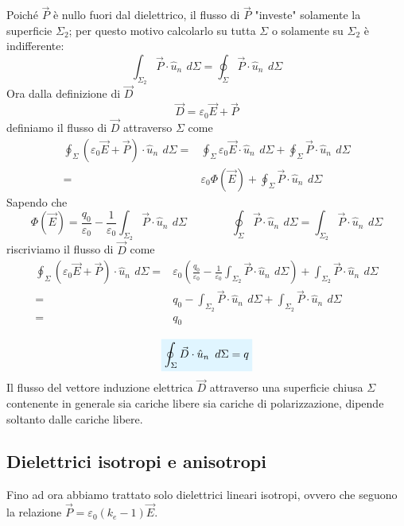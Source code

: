 \documentclass[x11names]{report}
\begin{document}
Poiché \(\vec{P}\) è nullo fuori dal dielettrico, il flusso di \(\vec{P}\) "investe" solamente la superficie \(\Sigma_2\); per questo motivo calcolarlo su tutta \(\Sigma\) o solamente su \(\Sigma_2\) è indifferente:
\[
\int_{\Sigma_2}\vec{P}\cdot\hat{u}_n \,\ d\Sigma = \oint_{\Sigma}\vec{P}\cdot\hat{u}_n \,\ d\Sigma
\]
Ora dalla definizione di \(\vec{D}\)
\[
\vec{D} = \varepsilon_0 \vec{E} + \vec{P}
\]
definiamo il flusso di \(\vec{D}\) attraverso \(\Sigma\) come
\begin{align*}
	\oint_\Sigma \left(\varepsilon_0 \vec{E} + \vec{P}\right)\cdot\hat{u}_n \,\ d\Sigma =& \oint_\Sigma \varepsilon_0 \vec{E}\cdot\hat{u}_n \,\ d\Sigma +  \oint_\Sigma\vec{P}\cdot\hat{u}_n \,\ d\Sigma  \\
	=& \varepsilon_0 \Phi(\vec{E}) +  \oint_\Sigma\vec{P}\cdot\hat{u}_n \,\ d\Sigma
\end{align*}
Sapendo che
\[
\Phi(\vec{E}) = \frac{q_0}{\varepsilon_0} - \frac{1}{\varepsilon_0} \int_{\Sigma_2} \vec{P}\cdot\hat{u}_n \,\ d\Sigma \qquad \qquad   \oint_{\Sigma}\vec{P}\cdot\hat{u}_n \,\ d\Sigma = \int_{\Sigma_2}\vec{P}\cdot\hat{u}_n \,\ d\Sigma 
\]
riscriviamo il flusso di \(\vec{D}\) come 
\begin{align*}
	\oint_\Sigma \left(\varepsilon_0 \vec{E} + \vec{P}\right)\cdot\hat{u}_n \,\ d\Sigma =& \varepsilon_0\left(\frac{q_0}{\varepsilon_0} - \frac{1}{\varepsilon_0} \int_{\Sigma_2} \vec{P}\cdot\hat{u}_n \,\ d\Sigma\right) + \int_{\Sigma_2}\vec{P}\cdot\hat{u}_n \,\ d\Sigma \\
	=& q_0 - \int_{\Sigma_2} \vec{P}\cdot\hat{u}_n \,\ d\Sigma+ \int_{\Sigma_2}\vec{P}\cdot\hat{u}_n \,\ d\Sigma \\
	=& q_0
\end{align*}

\begin{equation}
	\viola{\oint_\Sigma \vec{D}\cdot\hat{u}_n \,\ d\Sigma = q}
\end{equation}
Il flusso del vettore induzione elettrica \(\vec{D}\) attraverso una superficie chiusa \(\Sigma\) contenente in generale sia cariche libere sia cariche di polarizzazione, dipende soltanto dalle cariche libere.


\subsection{Dielettrici isotropi e anisotropi}
Fino ad ora abbiamo trattato solo dielettrici lineari isotropi, ovvero che seguono la relazione \(\vec{P} = \varepsilon_0(k_e - 1)\vec{E}\).
\end{document}

